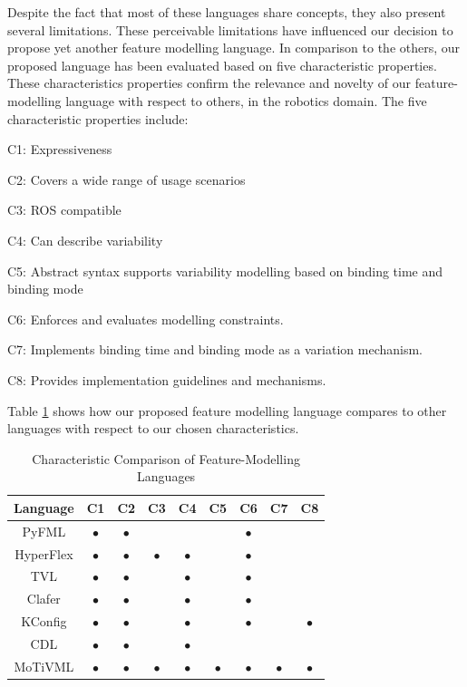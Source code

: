 \documentclass[conference]{IEEEtran}
\begin{document}
Despite the fact that most of these languages share concepts, they also present several limitations. These perceivable limitations have influenced our decision to propose yet another feature modelling language. In comparison to the others, our proposed language has been evaluated based on five characteristic properties. These characteristics properties confirm the relevance and novelty of our feature-modelling language with respect to others, in the robotics domain. The five characteristic properties include:
\begin{enumerate*}[label=(\roman*)]
	\item C1: Expressiveness
	\item C2: Covers a wide range of usage scenarios
	\item C3: ROS compatible
	\item C4: Can describe variability
	\item C5: Abstract syntax supports variability modelling based on binding time and binding mode
	\item C6: Enforces and evaluates modelling constraints.
	\item C7: Implements binding time and binding mode as a variation mechanism.
	\item C8: Provides implementation guidelines and mechanisms.
\end{enumerate*}

Table \ref{tab:compfml} shows how our proposed feature modelling language compares to other languages with respect to our chosen characteristics.
\begin{table}[htbp]
\caption{Characteristic Comparison of Feature-Modelling Languages}
\begin{center}
\begin{tabular}{|c|c|c|c|c|c|c|c|c|}
\hline
    Language & C1 & C2 & C3 & C4 & C5 & C6 & C7 & C8 \\ \hline
    PyFML & $\bullet$ & $\bullet$ &  &  & & $\bullet$ & &\\\hline
    HyperFlex & $\bullet$ & $\bullet$ & $\bullet$ & $\bullet$ &  & $\bullet$ & &\\\hline
    TVL & $\bullet$ & $\bullet$ &  & $\bullet$ & & $\bullet$ & &\\ \hline
    Clafer & $\bullet$ & $\bullet$ &  & $\bullet$ &  & $\bullet$ & &\\ \hline
    KConfig & $\bullet$ & $\bullet$ & & $\bullet$ &  & $\bullet$ & & $\bullet$\\ \hline
    CDL & $\bullet$ & $\bullet$ &  &  $\bullet$ &  & & &\\ \hline
    MoTiVML & $\bullet$ & $\bullet$ & $\bullet$ & $\bullet$ & $\bullet$ & $\bullet$ & $\bullet$ & $\bullet$\\ \hline
\end{tabular}
\label{tab:compfml}
\end{center}
\end{table}
\end{document}

